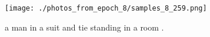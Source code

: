 \documentclass{article}%
\begin{document}
%


\begin{figure}[h!]%
\centering%
\texttt{[image: ./photos\_from\_epoch\_8/samples\_8\_259.png]}%
\caption{a man in a suit and tie standing in a room .}%
\end{figure}

%
\end{document}
